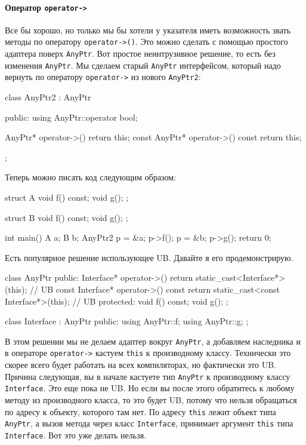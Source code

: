 \paragraph{Оператор \texttt{operator->}}
Все бы хорошо, но только мы бы хотели у указателя иметь возможность звать методы по оператору \texttt{operator->()}.
Это можно сделать с помощью простого адаптера поверх \texttt{AnyPtr}.
Вот простое неинтрузивное решение, то есть без изменения \texttt{AnyPtr}.
Мы сделаем старый \texttt{AnyPtr} интерфейсом, который надо вернуть по оператору \texttt{operator->} из нового \texttt{AnyPtr2}:
\begin{cppcode}
class AnyPtr2 : AnyPtr {
public:
  using AnyPtr::operator bool;

  AnyPtr* operator->() {
    return this;
  }
  const AnyPtr* operator->() const {
    return this;
  }
};
\end{cppcode}
Теперь можно писать код следующим образом:
\begin{cppcode}
struct A {
  void f() const;
  void g();
};

struct B {
  void f() const;
  void g();
};

int main() {
  A a;
  B b;
  AnyPtr2 p = &a;
  p->f();
  p = &b;
  p->g();
  return 0;
}
\end{cppcode}
Есть популярное решение использующее UB.
Давайте я его продемонстрирую.
\begin{cppcode}
class AnyPtr {
public:
  Interface* operator->() {
    return static_cast<Interface*>(this);  // UB
  }
  const Interface* operator->() const {
    return static_cast<const Interface*>(this); // UB
  }
protected:
  void f() const;
  void g();
};

class Interface : AnyPtr {
public:
  using AnyPtr::f;
  using AnyPtr::g;
};
\end{cppcode}
В этом решении мы не делаем адаптер вокруг \texttt{AnyPtr}, а добавляем наследника и в операторе \texttt{operator->} кастуем \texttt{this} к производному классу.
Технически это скорее всего будет работать на всех компиляторах, но фактически это UB.
Причина следующая, вы в начале кастуете тип \texttt{AnyPtr} к производному классу \texttt{Interface}.
Это еще пока не UB.
Но если вы после этого обратитесь к любому методу из производного класса, то это будет UB, потому что нельзя обращаться по адресу к объекту, которого там нет.
По адресу \texttt{this} лежит объект типа \texttt{AnyPtr}, а вызов метода через класс \texttt{Interface}, принимает аргумент \texttt{this} типа \texttt{Interface}.
Вот это уже делать нельзя.

